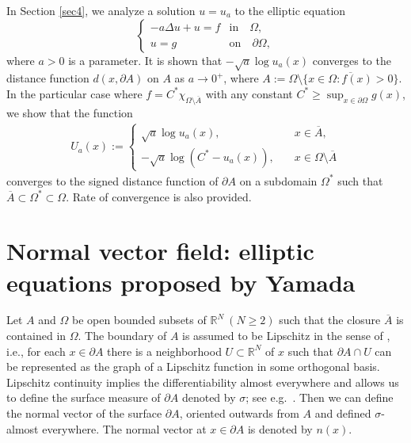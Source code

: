 \documentclass[graybox]{svmult}
\newcommand{\R}{\mathbb{R}}  %
\renewcommand{\AA}{A}  %
\begin{document}
In Section \ref{sec4}, we analyze a solution $u=u_a$ to the elliptic equation 
\begin{equation}\label{eq:sd0}
\begin{cases}
-a\Delta u+u = f & \text{in} \quad \Omega,\\
u=g&\text{on}\quad \partial \Omega,      
\end{cases}
\end{equation}
where $a>0$ is a parameter. It is shown that $-\sqrt{a} \log u_a(x)$ converges to the distance function $d(x,\partial \AA)$ on $\AA$ as $a\to0^+$, where $\AA:= \Omega \setminus \overline{\{x \in \Omega: f(x)>0\}}$. 
In the particular case where $f = C^* \chi_{\Omega \setminus \overline{\AA}}$ with any constant $C^* \ge \sup_{x\in \partial\Omega}g(x)$, we show that the function  
\begin{align}\label{eq:sdist}
    U_a(x):=
\begin{cases}
\sqrt{a}\log u_a(x),\quad &x \in \overline{\AA}, \\ 
-\sqrt{a}\log ( C^* -u_a(x)),\quad &x\in \Omega \setminus \overline{\AA} 
\end{cases}
\end{align}
converges to the signed distance function of $\partial \AA$
on a subdomain $\Omega^*$ such that $\overline{\AA} \subset \Omega^* \subset\Omega$. 
Rate of convergence is also provided.  









\section{Normal vector field: elliptic equations proposed by Yamada} \label{sec2}

Let $\AA$ and $\Omega$ be open bounded subsets of $\R^N~(N\ge2)$ such that the closure  $\overline{\AA}$ is contained in $\Omega$.  The boundary of $\AA$ is assumed to be Lipschitz in the sense of \cite[Definition 9.57]{Leo}, i.e., for each $x \in \partial\AA$ there is a neighborhood $U \subset \R^N$ of $x$ such that $\partial\AA \cap U$ can be represented as the graph of a Lipschitz function in some orthogonal basis. Lipschitz continuity implies the differentiability almost everywhere and allows us to define the surface measure of $\partial \AA$ denoted by $\sigma$; see e.g.~\cite[Example 9.56]{Leo}. Then we can define the normal vector of the surface $\partial \AA$, oriented outwards from $\AA$ and defined $\sigma$-almost everywhere. The normal vector at $x \in \partial \AA$ is denoted by $n(x)$. 
\end{document}
